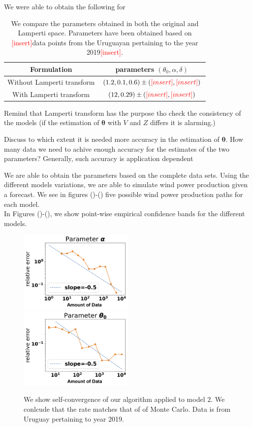 \documentclass[11pt]{article}
\theoremstyle{definition}
\newcommand{\add}{\textcolor{red}{[insert]}}
\begin{document}
We were able to obtain the following for 
\begin{table}[H]
\centering
\begin{tabular}{|c|c|}
\hline
Formulation   &  parameters $(\theta_0, \alpha,\delta)$    \\ \hline
Without Lamperti transform &   $(1.2,0.1,0.6) \pm (\add , \add) $   \\ \hline
With Lamperti transform &   $(12,0.29) \pm (\add , \add)  $   \\ \hline
\end{tabular}
\caption{We compare the parameters obtained in both the original and Lamperti space. Parameters have been obtained based on \add data points from the Uruguayan pertaining to the year 2019\add .}
\label{tab:model_comparison_2}
\end{table}

{\color{red} Remind that Lamperti transform has the purpose tho check the consistency of the models (if the estimation of $\bm{\theta}$ with $V$ and $Z$ differs it is alarming.)}

{\color{red} Discuss to which extent it is needed more accuracy in the estimation of $\bm{\theta}$. How many data we need to achive enough accuracy for the estimates of the two parameters? Generally, such accuracy is application dependent}

 We are able to obtain the parameters based on the complete data sets. Using the different models variations, we are able to simulate wind power production given a forecast. We see in figures ()-()
five possible wind power production paths for each model.\\

In Figures ()-(), we show point-wise empirical confidence bands for the different models.

\begin{figure}[H]
  \includegraphics[width=56mm,scale=1]{plots/alpha_conv_beta.png}
  \includegraphics[width=56mm,scale=1]{plots/theta_conv_beta.png}
  \caption{We show self-convergence of our algorithm applied to model $2$. We conlcude that the rate  matches that of of Monte Carlo. Data is from Uruguay pertaining to year 2019.}
\end{figure}
\end{document}

